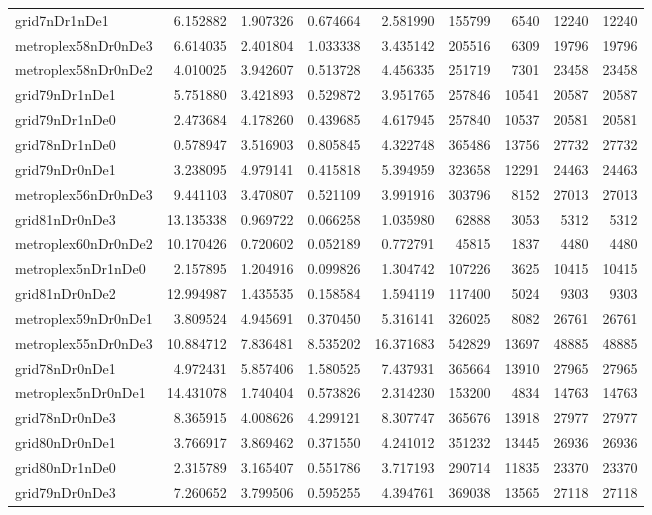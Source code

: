 \begin{longtable}{|l|r|r|r|r|r|r|r|r|}
grid7nDr1nDe1 & 6.152882 & 1.907326 & 0.674664 & 2.581990 & 155799 & 6540 & 12240 & 12240 \\
metroplex58nDr0nDe3 & 6.614035 & 2.401804 & 1.033338 & 3.435142 & 205516 & 6309 & 19796 & 19796 \\
metroplex58nDr0nDe2 & 4.010025 & 3.942607 & 0.513728 & 4.456335 & 251719 & 7301 & 23458 & 23458 \\
grid79nDr1nDe1 & 5.751880 & 3.421893 & 0.529872 & 3.951765 & 257846 & 10541 & 20587 & 20587 \\
grid79nDr1nDe0 & 2.473684 & 4.178260 & 0.439685 & 4.617945 & 257840 & 10537 & 20581 & 20581 \\
grid78nDr1nDe0 & 0.578947 & 3.516903 & 0.805845 & 4.322748 & 365486 & 13756 & 27732 & 27732 \\
grid79nDr0nDe1 & 3.238095 & 4.979141 & 0.415818 & 5.394959 & 323658 & 12291 & 24463 & 24463 \\
metroplex56nDr0nDe3 & 9.441103 & 3.470807 & 0.521109 & 3.991916 & 303796 & 8152 & 27013 & 27013 \\
grid81nDr0nDe3 & 13.135338 & 0.969722 & 0.066258 & 1.035980 & 62888 & 3053 & 5312 & 5312 \\
metroplex60nDr0nDe2 & 10.170426 & 0.720602 & 0.052189 & 0.772791 & 45815 & 1837 & 4480 & 4480 \\
metroplex5nDr1nDe0 & 2.157895 & 1.204916 & 0.099826 & 1.304742 & 107226 & 3625 & 10415 & 10415 \\
grid81nDr0nDe2 & 12.994987 & 1.435535 & 0.158584 & 1.594119 & 117400 & 5024 & 9303 & 9303 \\
metroplex59nDr0nDe1 & 3.809524 & 4.945691 & 0.370450 & 5.316141 & 326025 & 8082 & 26761 & 26761 \\
metroplex55nDr0nDe3 & 10.884712 & 7.836481 & 8.535202 & 16.371683 & 542829 & 13697 & 48885 & 48885 \\
grid78nDr0nDe1 & 4.972431 & 5.857406 & 1.580525 & 7.437931 & 365664 & 13910 & 27965 & 27965 \\
metroplex5nDr0nDe1 & 14.431078 & 1.740404 & 0.573826 & 2.314230 & 153200 & 4834 & 14763 & 14763 \\
grid78nDr0nDe3 & 8.365915 & 4.008626 & 4.299121 & 8.307747 & 365676 & 13918 & 27977 & 27977 \\
grid80nDr0nDe1 & 3.766917 & 3.869462 & 0.371550 & 4.241012 & 351232 & 13445 & 26936 & 26936 \\
grid80nDr1nDe0 & 2.315789 & 3.165407 & 0.551786 & 3.717193 & 290714 & 11835 & 23370 & 23370 \\
grid79nDr0nDe3 & 7.260652 & 3.799506 & 0.595255 & 4.394761 & 369038 & 13565 & 27118 & 27118 \\

\end{longtable}
